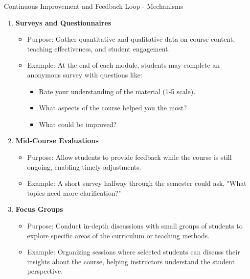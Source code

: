 \documentclass[aspectratio=169]{beamer}
\begin{document}
\begin{frame}[fragile]{Continuous Improvement and Feedback Loop - Mechanisms}
    \begin{enumerate}
        \item \textbf{Surveys and Questionnaires}
            \begin{itemize}
                \item Purpose: Gather quantitative and qualitative data on course content, teaching effectiveness, and student engagement.
                \item Example: At the end of each module, students may complete an anonymous survey with questions like:
                \begin{itemize}
                    \item Rate your understanding of the material (1-5 scale).
                    \item What aspects of the course helped you the most?
                    \item What could be improved?
                \end{itemize}
            \end{itemize}
        \item \textbf{Mid-Course Evaluations}
            \begin{itemize}
                \item Purpose: Allow students to provide feedback while the course is still ongoing, enabling timely adjustments.
                \item Example: A short survey halfway through the semester could ask, "What topics need more clarification?"
            \end{itemize}
        \item \textbf{Focus Groups}
            \begin{itemize}
                \item Purpose: Conduct in-depth discussions with small groups of students to explore specific areas of the curriculum or teaching methods.
                \item Example: Organizing sessions where selected students can discuss their insights about the course, helping instructors understand the student perspective.
            \end{itemize}
    \end{enumerate}
\end{frame}
\end{document}
